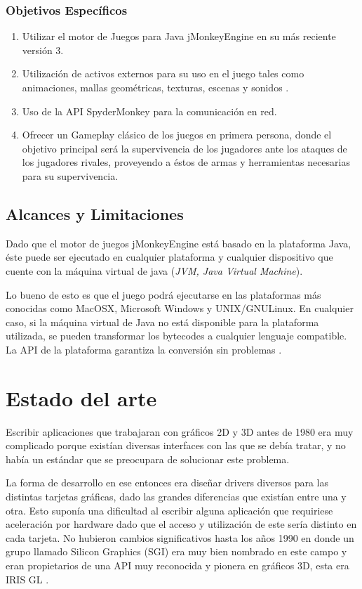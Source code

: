 \documentclass[a4paper,12pt,openany,oneside]{book}
\begin{document}
\subsection{Objetivos Específicos}
\begin{enumerate}
\item Utilizar el motor de Juegos para Java jMonkeyEngine en su más reciente versión 3.
\item Utilización de activos externos para su uso en el juego tales como animaciones, mallas geométricas, texturas, escenas y sonidos \cite{JMONKEY}.
\item Uso de la API SpyderMonkey \cite{BEGINNERS} para la comunicación en red.
\item Ofrecer un Gameplay clásico de los juegos en primera persona, donde el objetivo principal será la supervivencia de los jugadores ante los ataques de los jugadores rivales, proveyendo a éstos de armas y herramientas
necesarias para su supervivencia.
\end{enumerate}
\section{Alcances y Limitaciones}
Dado que el motor de juegos jMonkeyEngine está basado en la plataforma Java, éste puede ser ejecutado en cualquier plataforma y cualquier dispositivo que cuente con la máquina virtual de java (\textit{JVM, Java Virtual Machine}).

Lo bueno de esto es que el juego podrá ejecutarse en las plataformas más conocidas como MacOSX, Microsoft Windows y UNIX/GNULinux. En cualquier caso, si la máquina virtual de Java no está disponible para la plataforma utilizada, se pueden transformar los bytecodes a cualquier lenguaje compatible. La API de la plataforma garantiza la conversión sin problemas \cite{JMONKEY}.
\chapter{Estado del arte}
Escribir aplicaciones que trabajaran con gráficos 2D y 3D antes de 1980 era muy complicado porque existían diversas interfaces con las que se debía tratar, y no había un estándar que se preocupara de solucionar este problema.

La forma de desarrollo en ese entonces era diseñar drivers diversos para las distintas tarjetas gráficas, dado las grandes diferencias que existían entre una y otra. Esto suponía una dificultad al escribir alguna aplicación que requiriese aceleración por hardware dado que el acceso y utilización de este sería distinto en cada tarjeta. No hubieron cambios significativos hasta los años 1990 en donde un grupo llamado Silicon Graphics (SGI) era muy bien nombrado en este campo y eran propietarios de una API muy reconocida y pionera en gráficos 3D, esta era IRIS GL \cite{WIKI}.
\end{document}
